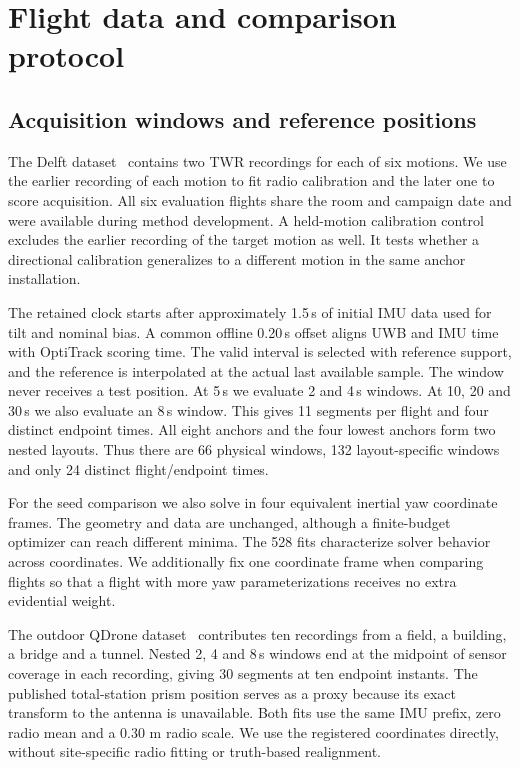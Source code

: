\documentclass{IEEEtaes}
\begin{document}
\section{Flight data and comparison protocol}\label{sec:protocol}
\subsection{Acquisition windows and reference positions}
The Delft dataset~\cite{delftdata} contains two TWR recordings for each of six motions. We use the earlier recording of each motion to fit radio calibration and the later one to score acquisition. All six evaluation flights share the room and campaign date and were available during method development. A held-motion calibration control excludes the earlier recording of the target motion as well. It tests whether a directional calibration generalizes to a different motion in the same anchor installation.

The retained clock starts after approximately 1.5\,s of initial IMU data used for tilt and nominal bias. A common offline 0.20\,s offset aligns UWB and IMU time with OptiTrack scoring time. The valid interval is selected with reference support, and the reference is interpolated at the actual last available sample. The window never receives a test position. At 5\,s we evaluate 2 and 4\,s windows. At 10, 20 and 30\,s we also evaluate an 8\,s window. This gives 11 segments per flight and four distinct endpoint times. All eight anchors and the four lowest anchors form two nested layouts. Thus there are 66 physical windows, 132 layout-specific windows and only 24 distinct flight/endpoint times.

For the seed comparison we also solve in four equivalent inertial yaw coordinate frames. The geometry and data are unchanged, although a finite-budget optimizer can reach different minima. The 528 fits characterize solver behavior across coordinates. We additionally fix one coordinate frame when comparing flights so that a flight with more yaw parameterizations receives no extra evidential weight.

The outdoor QDrone dataset~\cite{qdrone} contributes ten recordings from a field, a building, a bridge and a tunnel. Nested 2, 4 and 8\,s windows end at the midpoint of sensor coverage in each recording, giving 30 segments at ten endpoint instants. The published total-station prism position serves as a proxy because its exact transform to the antenna is unavailable. Both fits use the same IMU prefix, zero radio mean and a \(0.30\) m radio scale. We use the registered coordinates directly, without site-specific radio fitting or truth-based realignment.
\end{document}
